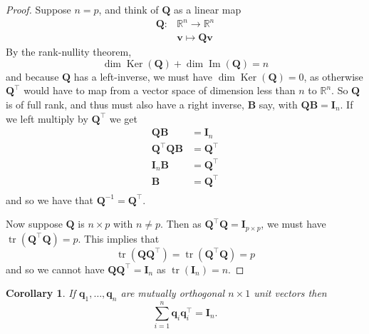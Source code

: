 \documentclass[
]{book}
\newtheorem{corollary}{Corollary}[chapter]
\theoremstyle{definition}
\theoremstyle{definition}
\theoremstyle{definition}
\theoremstyle{definition}
\theoremstyle{remark}
\begin{document}
\begin{proof}
Suppose \(n=p\), and think of \(\mathbf Q\) as a linear map
\begin{align*}
\mathbf Q: &\mathbb{R}^n \rightarrow \mathbb{R}^n\\
&\mathbf v\mapsto \mathbf Q\mathbf v
\end{align*}
By the rank-nullity theorem,
\[\dim \operatorname{Ker}(\mathbf Q) + \dim \operatorname{Im}(\mathbf Q) =n\]
and because \(\mathbf Q\) has a left-inverse, we must have \(\dim \operatorname{Ker}(\mathbf Q)=0\), as otherwise \(\mathbf Q^\top\) would have to map from a vector space of dimension less than \(n\) to \(\mathbb{R}^n\). So \(\mathbf Q\) is of full rank, and thus must also have a right inverse, \(\mathbf B\) say, with \(\mathbf Q\mathbf B=\mathbf I_n\). If we left multiply by \(\mathbf Q^\top\) we get
\begin{align*}
\mathbf Q\mathbf B&=\mathbf I_n\\
\mathbf Q^\top\mathbf Q\mathbf B&=\mathbf Q^\top\\
\mathbf I_n \mathbf B&= \mathbf Q^\top\\
\mathbf B&= \mathbf Q^\top\\
\end{align*}
and so we have that \(\mathbf Q^{-1}=\mathbf Q^\top\).

Now suppose \(\mathbf Q\) is \(n \times p\) with \(n\not = p\). Then as
\(\mathbf Q^\top \mathbf Q=\mathbf I_{p\times p}\), we must have \(\operatorname{tr}(\mathbf Q^\top \mathbf Q)=p\). This implies that
\[\operatorname{tr}(\mathbf Q\mathbf Q^\top)=\operatorname{tr}(\mathbf Q^\top \mathbf Q)=p\] and so
we cannot have \(\mathbf Q\mathbf Q^\top=\mathbf I_{n}\) as \(\operatorname{tr}{(\mathbf I_{n})}=n\).
\end{proof}

\begin{corollary}
\protect\hypertarget{cor:two1}{}\label{cor:two1}If \(\mathbf q_1, \ldots , \mathbf q_n\) are mutually orthogonal \(n \times 1\) unit vectors then
\[
\sum_{i=1}^n \mathbf q_i \mathbf q_i^\top = {\mathbf I}_n.
\]
\end{corollary}
\end{document}
